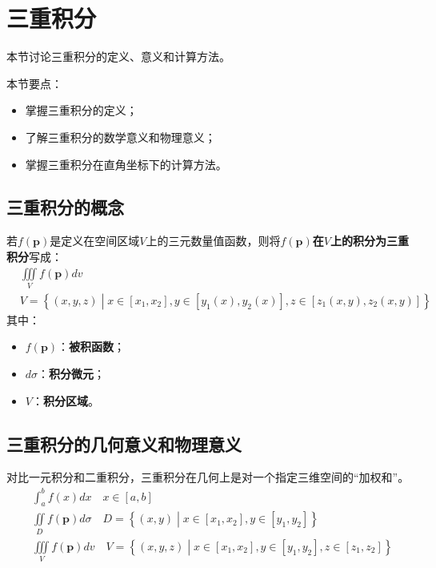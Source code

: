 \section{三重积分}

本节讨论三重积分的定义、意义和计算方法。

本节要点：
\begin{itemize}
    \item 掌握三重积分的定义；
    \item 了解三重积分的数学意义和物理意义；
    \item 掌握三重积分在直角坐标下的计算方法。
\end{itemize}

\subsection{三重积分的概念}

\begin{definition}[三重积分]
若$f\left( \boldsymbol{p} \right) $是定义在空间区域$V$上的三元数量值函数，则将{\bf $f\left( \boldsymbol{p} \right) $在$V$上的积分为三重积分}写成：
\begin{align*}
&\iiint\limits_V{f\left( \boldsymbol{p} \right) dv} \\
&V=\left\{ \left( x,y,z \right) \middle| x\in \left[ x_1,x_2 \right] ,y\in \left[ y_1\left( x \right) ,y_2\left( x \right) \right] ,z\in \left[ z_1\left( x,y \right) ,z_2\left( x,y \right) \right] \right\}
\end{align*}
其中：
\begin{itemize}
    \item $f\left( \boldsymbol{p} \right) $：{\bf 被积函数}；
    \item $d\sigma$：{\bf 积分微元}；
    \item $V$：{\bf 积分区域}。
\end{itemize}
\end{definition}

\subsection{三重积分的几何意义和物理意义}

对比一元积分和二重积分，三重积分在几何上是对一个指定三维空间的“加权和”。
\begin{align*}
&\int_a^b{f\left( x \right) dx} \quad x\in \left[ a,b \right] \\
&\iint\limits_D{f\left( \boldsymbol{p} \right) d\sigma} \quad D=\left\{ \left( x,y \right) \middle| x\in \left[ x_1,x_2 \right] ,y\in \left[ y_1,y_2 \right] \right\} \\
&\iiint\limits_V{f\left( \boldsymbol{p} \right) dv} \quad V=\left\{ \left( x,y,z \right) \middle| x\in \left[ x_1,x_2 \right] ,y\in \left[ y_1,y_2 \right] ,z\in \left[ z_1,z_2 \right] \right\}
\end{align*}

